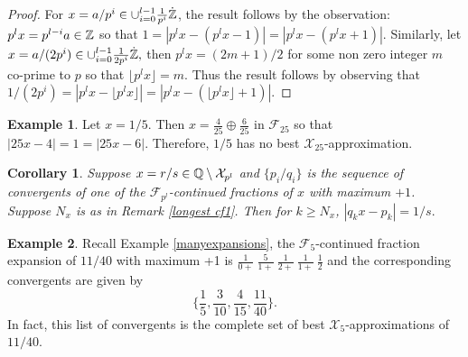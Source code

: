 \documentclass[12pt]{elsarticle}
\newtheorem{corollary}[theorem]{Corollary}
\theoremstyle{definition}
\newtheorem{example}{Example}
\newcommand{\mX}{{\mathcal X}}
\newcommand{\f}{{\mathcal F}}
\begin{document}
{\begin{proof}
  		For $x=a/p^i\in\cup_{i=0}^{l-1}\frac{1}{p^i}\dot{\mathbb{Z}}$, the result follows by the observation: $p^lx=p^{l-i}a\in\mathbb{Z}$ so that $1=|p^l x -(p^lx-1)|=|p^l x - (p^lx+1)|.$ 
  			Similarly, let $x=a/(2p^i)\in\cup_{i=0}^{l-1}\frac{1}{2p^i}\dot{\mathbb{Z}},$ then $p^l x=(2m+1)/2$ for some non zero integer $m$ co-prime to $p$ so that $\lfloor p^lx\rfloor=m$. Thus the result follows by observing that $1/(2p^i)=|p^lx-\lfloor p^l x\rfloor |=|p^lx-(\lfloor p^lx\rfloor +1)|.$\end{proof}
  		\begin{example}
  			Let $x=1/5$. Then $x=\frac{4}{25}\oplus\frac{6}{25}$ in $\f_{25}$ so that $|25x-4|=1=|25x-6|.$ Therefore, $1/5$ has no best $\mX_{25}$-approximation.
  		\end{example}
  		
  		\begin{corollary}\label{constantdifference}
  			Suppose $x=r/s\in\Q\setminus\mX_{p^l}$ and $\{p_i/q_i\}$ is the sequence of convergents of one of the $\f_{p^l}$-continued fractions of $x$ with maximum $+1$. Suppose  $N_x$ is as in Remark \ref{longest cf1}. 
  			Then for $k\ge N_x$,	$|q_kx-p_k|=1/s.$
  		\end{corollary}
  		
  			
  		\begin{example}	Recall Example \ref{manyexpansions}, the  $\f_{5}$-continued fraction expansion of $11/40$ with maximum +1 is
  			$\frac{1}{0+}~\frac{5}{1+}~\frac{1}{2+}~\frac{1}{1+}~\frac{1}{2}$ and the corresponding convergents are given by
  			$$\Big\{\frac{1}{5},\frac{3}{10},\frac{4}{15},\frac{11}{40}\Big\}.$$
  			In fact, this list of convergents is the complete set of best $\mX_5$-approximations of $11/40$. 
  			

\end{example}}
\end{document}
